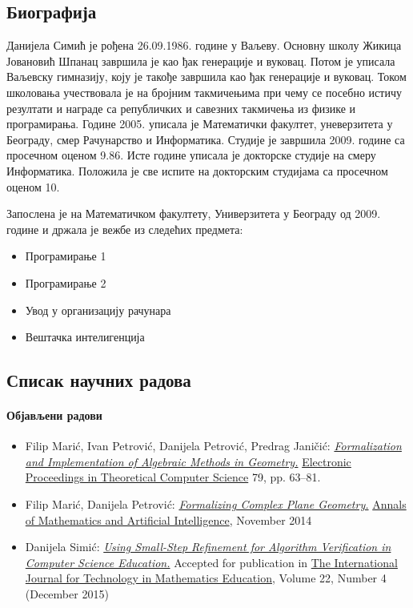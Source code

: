 \documentclass[11pt]{article}
\newcommand{\lat}{}
\begin{document}
\subsection{Биографија}
   Данијела Симић је рођена 26.09.1986. године у Ваљеву. Основну школу 
   Жикица Јовановић Шпанац завршила је као ђак генерације и вуковац. 
   Потом је уписала Ваљевску гимназију, коју је такође завршила као ђак 
   генерације и вуковац. Током школовања учествовала је на бројним такмичењима
   при чему се посебно истичу резултати и награде са републичких и савезних 
   такмичења из физике и програмирања. Године 2005. уписала је Математички
   факултет, уневерзитета у Београду, смер Рачунарство и Информатика. 
   Студије је завршила 2009. године са просечном оценом 9.86. Исте године
   уписала је докторске студије на смеру Информатика. Положила је све испите 
   на докторским студијама са просечном оценом 10.
   
   Запослена је на Математичком факултету, Универзитета у Београду од 2009.
   године и држала је вежбе из следећих предмета:
   \begin{itemize}
   \item Програмирање 1
   \item Програмирање 2
   \item Увод у организацију рачунара
   \item Вештачка интелигенција
   \end{itemize}
   
\subsection{Списак научних радова}

\paragraph{Објављени радови}
\begin{itemize}
\item {\lat Filip Marić, Ivan Petrović, Danijela Petrović, Predrag
    Janičić:
    \href{http://eptcs.web.cse.unsw.edu.au/paper.cgi?THedu11.4}{{\em Forma\-lization
      and Implementation of Algebraic Methods in Geometry.}}
    \href{http://about.eptcs.org/}{Electronic Proceedings in
      Theoretical Computer Science} 79, pp. 63–81.}
\item {\lat Filip Marić, Danijela Petrović:
    \href{http://argo.matf.bg.ac.rs/publications/2014/moebius.pdf}{{\em Formalizing
      Complex Plane Geometry.}}
    \href{http://link.springer.com/article/10.1007/s10472-014-9436-4}{Annals
      of Mathematics and Artificial Intelligence}, November 2014}
\item {\lat Danijela Simić:
    \href{http://argo.matf.bg.ac.rs/publications/2014/small-step-verification.pdf}{{\em Using
      Small-Step Refinement for Algorithm Verification in Computer
      Science Education.}} Accepted for publication in
    \href{https://www.fose1.plymouth.ac.uk/mathematics\_education/field\%20of\%20work/IJTME/}{The
      International Journal for Technology in Mathematics Education},
    Volume 22, Number 4 (December 2015)}
\end{itemize}
\end{document}
